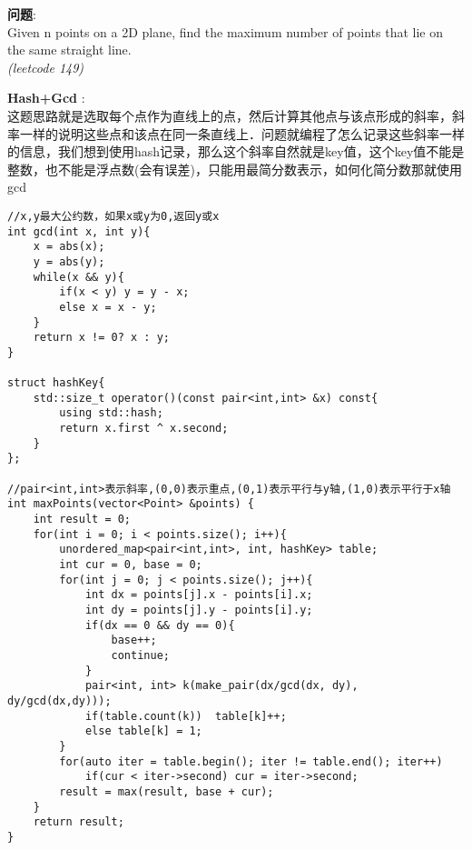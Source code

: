     
\begin{description}
    \item{\textbf{问题}}:\\
Given n points on a 2D plane, find the maximum number of points that lie on the same straight line.\\
\textit{(leetcode 149)}
    \item{\textbf{Hash+Gcd}} : 
    \\这题思路就是选取每个点作为直线上的点，然后计算其他点与该点形成的斜率，斜率一样的说明这些点和该点在同一条直线上．问题就编程了怎么记录这些斜率一样的信息，我们想到使用hash记录，那么这个斜率自然就是key值，这个key值不能是整数，也不能是浮点数(会有误差)，只能用最简分数表示，如何化简分数那就使用gcd
    \begin{lstlisting}
//x,y最大公约数，如果x或y为0,返回y或x
int gcd(int x, int y){
	x = abs(x);
	y = abs(y);
	while(x && y){
		if(x < y) y = y - x;
		else x = x - y;
	}
	return x != 0? x : y;
}

struct hashKey{
	std::size_t operator()(const pair<int,int> &x) const{
		using std::hash;
		return x.first ^ x.second;
	}
};

//pair<int,int>表示斜率,(0,0)表示重点,(0,1)表示平行与y轴,(1,0)表示平行于x轴
int maxPoints(vector<Point> &points) {
	int result = 0;
	for(int i = 0; i < points.size(); i++){
		unordered_map<pair<int,int>, int, hashKey> table;
		int cur = 0, base = 0;
		for(int j = 0; j < points.size(); j++){
			int dx = points[j].x - points[i].x;
			int dy = points[j].y - points[i].y;
			if(dx == 0 && dy == 0){
				base++;
				continue;
			}
			pair<int, int> k(make_pair(dx/gcd(dx, dy), dy/gcd(dx,dy)));
			if(table.count(k))	table[k]++;
			else table[k] = 1;
		}
		for(auto iter = table.begin(); iter != table.end(); iter++)
			if(cur < iter->second) cur = iter->second;
		result = max(result, base + cur);
	}
	return result;
}
    \end{lstlisting}
\end{description}
